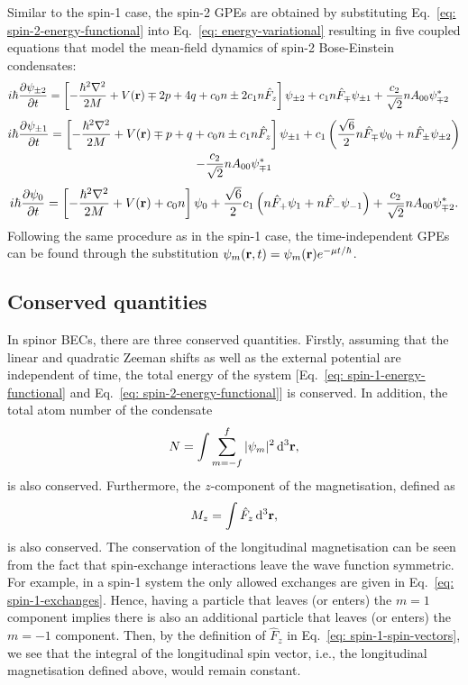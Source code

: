Similar to the spin-1 case, the spin-2 GPEs are obtained by substituting
Eq.~\eqref{eq: spin-2-energy-functional} into Eq.~\eqref{eq: energy-variational}
resulting in five coupled equations that model the mean-field dynamics of spin-2
Bose-Einstein condensates:
\begin{align}\label{eq: spin-2-GPEs-pm2}   
    i\hbar\pdv{\psi_{\pm 2}}{t} &= \left[-\frac{\hbar^2\nabla^2}{2M}
        + V(\vb{r}) \mp 2p + 4q + c_0n \pm 2c_1n\hat{F}_z\right]\psi_{\pm 2}
    + c_1n\hat{F}_{\mp}\psi_{\pm 1} + \frac{c_2}{\sqrt{2}}nA_{00}\psi_{\mp 2}^*
\end{align}
\begin{multline}\label{eq: spin-2-GPEs-pm1}
    i\hbar\pdv{\psi_{\pm 1}}{t} = \left[-\frac{\hbar^2\nabla^2}{2M}
    + V(\vb{r}) \mp p + q + c_0n \pm c_1n\hat{F}_z\right]\psi_{\pm 1}
    + c_1\left(\frac{\sqrt{6}}{2}n\hat{F}_{\mp}\psi_0
    + n\hat{F}_{\pm}\psi_{\pm 2}\right) \\
    - \frac{c_2}{\sqrt{2}}nA_{00}\psi_{\mp 1}^* 
\end{multline}
\begin{align}\label{eq: spin-2-GPEs-0}
    i\hbar\pdv{\psi_0}{t} = \left[-\frac{\hbar^2\nabla^2}{2M}
    + V(\vb{r}) + c_0n\right]\psi_0
    + \frac{\sqrt{6}}{2}c_1\left(n\hat{F}_+\psi_1 + n\hat{F}_-\psi_{-1}\right)
    + \frac{c_2}{\sqrt{2}}nA_{00}\psi_{\mp 2}^*.
\end{align}
Following the same procedure as in the spin-1 case, the time-independent GPEs
can be found through the substitution \(\psi_m(\vb{r}, t) = \psi_m(\vb{r})
e^{-\mu t/\hbar}\).

\subsection{Conserved quantities}\label{subsec: conserved-quantities}
In spinor BECs, there are three conserved quantities.
Firstly, assuming that the linear and quadratic Zeeman shifts as well as the
external potential are independent of time, the total energy of the system
[Eq.~\eqref{eq: spin-1-energy-functional} and
Eq.~\eqref{eq: spin-2-energy-functional}] is conserved.
In addition, the total atom number of the condensate
\begin{align}
    N = \int \sum_{m=-f}^f |\psi_m|^2 \, \dd^3\vb{r},
\end{align}
is also conserved.
Furthermore, the \(z\)-component of the magnetisation, defined as
\begin{align}\label{eq: magnetisation-formula}
    M_z = \int \hat{F}_z \, \dd^3\vb{r},
\end{align}
is also conserved.
The conservation of the longitudinal magnetisation can be seen from the fact
that spin-exchange interactions leave the wave function symmetric.
For example, in a spin-1 system the only allowed exchanges are given in
Eq.~\eqref{eq: spin-1-exchanges}.
Hence, having a particle that leaves (or enters) the \(m=1\) component implies
there is also an additional particle that leaves (or enters) the \(m=-1\)
component.
Then, by the definition of \(\hat{F}_z\) in Eq.~\eqref{eq: spin-1-spin-vectors},
we see that the integral of the longitudinal spin vector, i.e., the longitudinal
magnetisation defined above, would remain constant.

